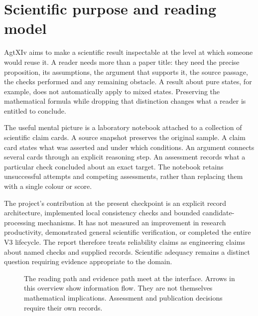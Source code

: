 \section{Scientific purpose and reading model}\label{sec:purpose}

AgtXIv aims to make a scientific result inspectable at the level at which someone would reuse it. A reader needs more than a paper title: they need the precise proposition, its assumptions, the argument that supports it, the source passage, the checks performed and any remaining obstacle. A result about pure states, for example, does not automatically apply to mixed states. Preserving the mathematical formula while dropping that distinction changes what a reader is entitled to conclude.

The useful mental picture is a laboratory notebook attached to a collection of scientific claim cards. A source snapshot preserves the original sample. A claim card states what was asserted and under which conditions. An argument connects several cards through an explicit reasoning step. An assessment records what a particular check concluded about an exact target. The notebook retains unsuccessful attempts and competing assessments, rather than replacing them with a single colour or score.

The project's contribution at the present checkpoint is an explicit record architecture, implemented local consistency checks and bounded candidate-processing mechanisms. It has not measured an improvement in research productivity, demonstrated general scientific verification, or completed the entire V3 lifecycle. The report therefore treats reliability claims as engineering claims about named checks and supplied records. Scientific adequacy remains a distinct question requiring evidence appropriate to the domain.

\begin{figure}[htbp]
\centering
{}
\caption{The reading path and evidence path meet at the interface. Arrows in this overview show information flow. They are not themselves mathematical implications. Assessment and publication decisions require their own records.}
\label{fig:overview}
\end{figure}

